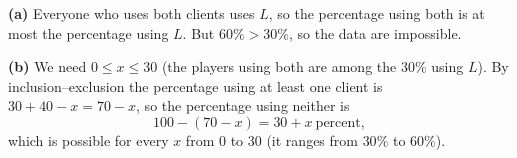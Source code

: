 \textbf{(a)} Everyone who uses both clients uses $L$, so the percentage using both is at most the percentage using $L$. But $60\%>30\%$, so the data are impossible.

\textbf{(b)} We need $0\le x\le30$ (the players using both are among the $30\%$ using $L$). By inclusion--exclusion the percentage using at least one client is $30+40-x=70-x$, so the percentage using neither is
\[\boxed{100-(70-x)=30+x\ \text{percent}},\]
which is possible for every $x$ from $0$ to $30$ (it ranges from $30\%$ to $60\%$).

